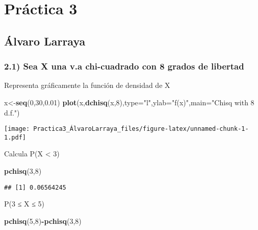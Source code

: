\documentclass[
]{article}
\author{}
\date{\vspace{-2.5em}}
\newenvironment{Shaded}{\begin{snugshade}}{\end{snugshade}}
\newcommand{\DataTypeTok}[1]{\textcolor[rgb]{0.13,0.29,0.53}{#1}}
\newcommand{\DecValTok}[1]{\textcolor[rgb]{0.00,0.00,0.81}{#1}}
\newcommand{\FloatTok}[1]{\textcolor[rgb]{0.00,0.00,0.81}{#1}}
\newcommand{\KeywordTok}[1]{\textcolor[rgb]{0.13,0.29,0.53}{\textbf{#1}}}
\newcommand{\NormalTok}[1]{#1}
\newcommand{\OperatorTok}[1]{\textcolor[rgb]{0.81,0.36,0.00}{\textbf{#1}}}
\newcommand{\StringTok}[1]{\textcolor[rgb]{0.31,0.60,0.02}{#1}}
\begin{document}
\hypertarget{pruxe1ctica-3}{%
\section{Práctica 3}\label{pruxe1ctica-3}}

\hypertarget{uxe1lvaro-larraya}{%
\subsection{Álvaro Larraya}\label{uxe1lvaro-larraya}}

\hypertarget{sea-x-una-v.a-chi-cuadrado-con-8-grados-de-libertad}{%
\subsubsection{2.1) Sea X una v.a chi-cuadrado con 8 grados de
libertad}\label{sea-x-una-v.a-chi-cuadrado-con-8-grados-de-libertad}}

Representa gráficamente la función de densidad de X

\begin{Shaded}
\begin{Highlighting}[]
\NormalTok{x<-}\KeywordTok{seq}\NormalTok{(}\DecValTok{0}\NormalTok{,}\DecValTok{30}\NormalTok{,}\FloatTok{0.01}\NormalTok{)}
\KeywordTok{plot}\NormalTok{(x,}\KeywordTok{dchisq}\NormalTok{(x,}\DecValTok{8}\NormalTok{),}\DataTypeTok{type=}\StringTok{"l"}\NormalTok{,}\DataTypeTok{ylab=}\StringTok{"f(x)"}\NormalTok{,}\DataTypeTok{main=}\StringTok{"Chisq with 8 d.f."}\NormalTok{)}
\end{Highlighting}
\end{Shaded}

\texttt{[image: Practica3\_ÁlvaroLarraya\_files/figure-latex/unnamed-chunk-1-1.pdf]}

Calcula P(X \textless{} 3)

\begin{Shaded}
\begin{Highlighting}[]
\KeywordTok{pchisq}\NormalTok{(}\DecValTok{3}\NormalTok{,}\DecValTok{8}\NormalTok{)}
\end{Highlighting}
\end{Shaded}

\begin{verbatim}
## [1] 0.06564245
\end{verbatim}

P(3 ≤ X ≤ 5)

\begin{Shaded}
\begin{Highlighting}[]
\KeywordTok{pchisq}\NormalTok{(}\DecValTok{5}\NormalTok{,}\DecValTok{8}\NormalTok{)}\OperatorTok{-}\KeywordTok{pchisq}\NormalTok{(}\DecValTok{3}\NormalTok{,}\DecValTok{8}\NormalTok{)}
\end{Highlighting}
\end{Shaded}
\end{document}
